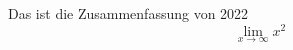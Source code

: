 \documentclass[12 pt]{extbook}
\begin{document}
    \centering
    Das ist die Zusammenfassung von 2022\newline
    \[
    \lim_{x \to \infty}  x^2
    \]
\end{document}
